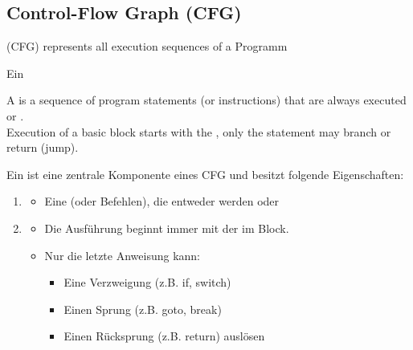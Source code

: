 \subsection{Control-Flow Graph (CFG)}
 (CFG) represents all execution sequences of a Programm 
\begin{infoBox}[title=Control-Flow Graph (CFG): Überblick]
    Ein 
\end{infoBox}
\begin{defBox}[title=Basic Block (in a CFG)]
    A  is a  sequence of  program statements (or instructions) that are always executed  or .\\
    Execution of a basic block starts with the , only the  statement may branch or return (jump).
\end{defBox}
\begin{infoBox}[title=Grundlegendes: Basic Block]
    Ein  ist eine zentrale Komponente eines CFG und besitzt folgende Eigenschaften:
    \begin{enumerate}
        \item {}
        \begin{itemize}
            \item Eine  (oder Befehlen), die entweder  werden oder 
        \end{itemize}
        \item {}
        \begin{itemize}
            \item {} Die Ausführung beginnt immer mit der  im Block.
            \item {} Nur die letzte Anweisung kann:
            \begin{itemize}
                \item Eine Verzweigung (z.B. if, switch)
                \item Einen Sprung (z.B. goto, break)
                \item Einen Rücksprung (z.B. return) auslösen
            \end{itemize}
        \end{itemize}
    \end{enumerate}
\end{infoBox}
